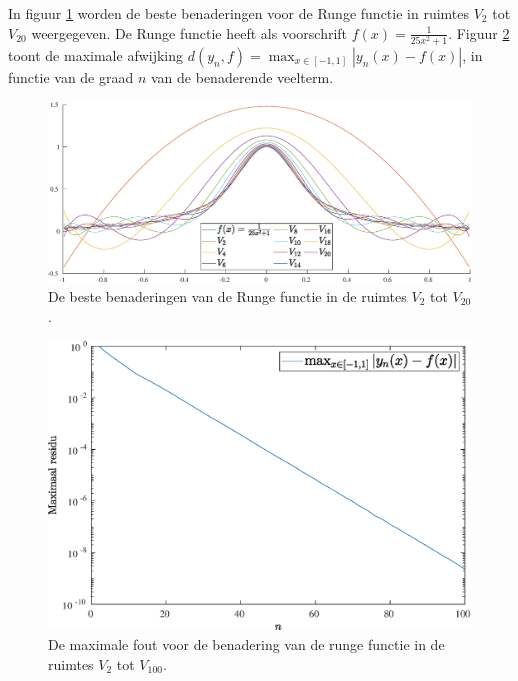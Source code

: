 \documentclass[a4paper, 12pt, titlepage, fleqn]{article}
\begin{document}
In figuur \ref{fig:rungeFunctie} worden de beste benaderingen voor de Runge functie in ruimtes $V_2$ tot $V_{20}$ weergegeven. De Runge functie heeft als voorschrift $f(x) = \frac{1}{25x^2+1}$. Figuur \ref{fig:rungeFoutBenadering} toont de maximale afwijking $d(y_n,f) = \max_{x \in [-1,1]}|y_n(x)-f(x)|$, in functie van de graad $n$ van de benaderende veelterm. 
\begin{figure}
\centering
\includegraphics[scale=0.4]{../Afbeeldingen/rungeBenadering.eps}
\caption{De beste benaderingen van de Runge functie in de ruimtes $V_2$ tot $V_{20}$.
\label{fig:rungeFunctie}}
\end{figure}

\begin{figure}
\centering
\includegraphics[scale=0.4]{../Afbeeldingen/rungeFout.eps}
\caption{De maximale fout voor de benadering van de runge functie in de ruimtes $V_2$ tot $V_{100}$.
\label{fig:rungeFoutBenadering}}
\end{figure}
\end{document}
